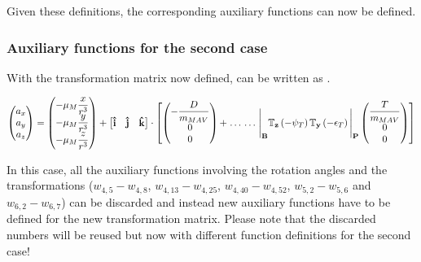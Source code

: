 Given these definitions, the corresponding auxiliary functions can now be defined. 

\subsubsection{Auxiliary functions for the second case}
\label{subsubsec:auxFsecCase}
With the transformation matrix now defined,  can be written as .

\begin{equation} \label{eq:accAlTrans}
\begin{pmatrix}
a_{x}\\
a_{y}\\
a_{z}\\
\end{pmatrix}
=
\begin{pmatrix}
-\mu_{M}\dfrac{x}{r^{3}}\\
-\mu_{M}\dfrac{y}{r^{3}}\\
-\mu_{M}\dfrac{z}{r^{3}}\\
\end{pmatrix}+
\left[
\begin{matrix}
\mathbf{\hat{i}} & \mathbf{\hat{j}} & \mathbf{\hat{k}} \\
\end{matrix}
\right]
\cdot
\left[
\begin{pmatrix}
-\dfrac{D}{m_{MAV}}\\
0\\
0\\
\end{pmatrix}
+  \right. \dots \\
\dotsc
 \left.
\Bigg|_{\mathbf{B}}\mathbb{T}_{\mathbf{z}}\left(-\psi_{T}\right)\mathbb{T}_{\mathbf{y}}\left(-\epsilon_{T}\right)\Bigg|_{\mathbf{P}}
\begin{pmatrix}
\dfrac{T}{m_{MAV}}\\
0\\
0\\
\end{pmatrix}
\right]
\end{equation}

In this case, all the auxiliary functions involving the rotation angles and the transformations ($w_{4,5}-w_{4,8}$, $w_{4,13}-w_{4,25}$, $w_{4,40}-w_{4,52}$, $w_{5,2}-w_{5,6}$ and $w_{6,2}-w_{6,7}$) can be discarded and instead new auxiliary functions have to be defined for the new transformation matrix. Please note that the discarded numbers will be reused but now with different function definitions for the second case!

